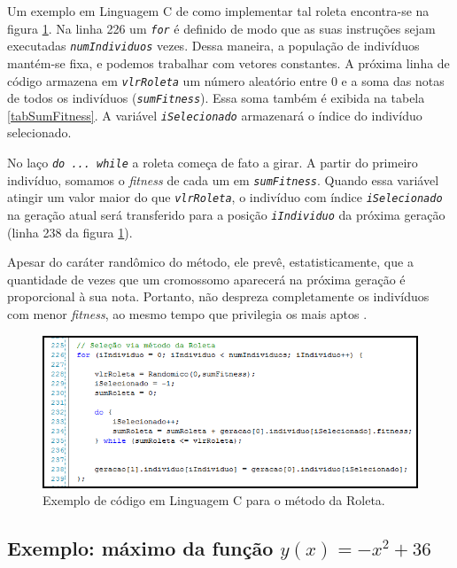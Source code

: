 	Um exemplo em Linguagem C de como implementar tal roleta encontra-se na figura \ref{figCodRoleta}. Na linha 226 um \textit{\texttt{for}} é definido de modo que as suas instruções sejam executadas \textit{\texttt{numIndividuos}} vezes. Dessa maneira, a população de indivíduos mantém-se fixa, e podemos trabalhar com vetores constantes. A próxima linha de código armazena em \textit{\texttt{vlrRoleta}} um número aleatório entre 0 e a soma das notas de todos os indivíduos (\textit{\texttt{sumFitness}}). Essa soma também é exibida na tabela \ref{tabSumFitness}. A variável \textit{\texttt{iSelecionado}} armazenará o índice do indivíduo selecionado.
	
	No laço \textit{\texttt{do ... while}} a roleta começa de fato a girar. A partir do primeiro indivíduo, somamos o \textit{fitness} de cada um em \textit{\texttt{sumFitness}}. Quando essa variável atingir um valor maior do que \textit{\texttt{vlrRoleta}}, o indivíduo com índice \textit{\texttt{iSelecionado}} na geração atual será transferido para a posição \textit{\texttt{iIndividuo}} da próxima geração (linha 238 da figura \ref{figCodRoleta}). 
	
	Apesar do caráter randômico do método, ele prevê, estatisticamente, que a quantidade de vezes que um cromossomo aparecerá na próxima geração é proporcional à sua nota. Portanto, não despreza completamente os indivíduos com menor \textit{fitness}, ao mesmo tempo que privilegia os mais aptos \cite{Linden2008}.

	\begin{figure}[htp]
		\begin{center}
			\includegraphics[width=13cm]{figs/ga/CodigoRoleta.png}
		\end{center}
		\caption{\label{figCodRoleta}Exemplo de código em Linguagem C para o método da Roleta.}
	\end{figure}
	
	\subsection{Exemplo: máximo da função $y(x) = -x^2 + 36$}
	
